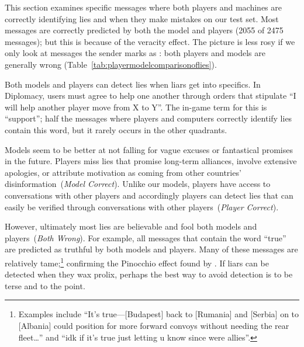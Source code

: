 This section examines specific messages where both players and machines
are correctly identifying lies and when they make mistakes on our test set.
%
Most messages are correctly predicted by both the model and players
(2055 of 2475 messages); but this is because of the veracity effect.
%
The picture is less rosy if we only look at messages the sender marks
as \alie{}: both players and models are generally wrong
(Table~\ref{tab:playermodelcomparisonoflies}).

Both models and players can detect lies when liars get into specifics.
%
In Diplomacy, users must agree to help one another through orders that
stipulate ``I will help another player move from X to Y''.
%
The in-game term for this is ``support''; half the messages where
players and computers correctly identify lies contain this word, but it
rarely occurs in the other quadrants.


Models seem to be better at not falling for vague excuses or
fantastical promises in the future.
%
Players miss lies that promise long-term alliances, involve extensive
apologies, or attribute motivation as coming from other countries'
disinformation~(\textit{Model Correct}).
%
Unlike our models, players have access to conversations with other
players and accordingly players can detect lies that can easily be
verified through conversations with other players~(\textit{Player
  Correct}).

However, ultimately most lies are believable and fool both models and
players~(\textit{Both Wrong}).
%
For example, all messages that contain the word ``true'' are predicted
as truthful by both models and players.
%
Many of these messages are relatively tame;\footnote{Examples include
  ``It's true---[Budapest] back to [Rumania] and [Serbia] on to
  [Albania] could position for more forward convoys without needing
  the rear fleet\dots'' and ``idk if it's true just letting u know
  since were allies''.} confirming the Pinocchio effect found by
\citet{vanswol-12}.
%
If liars can be detected when they wax prolix, perhaps the best way to
avoid detection is to be terse and to the point.


%

